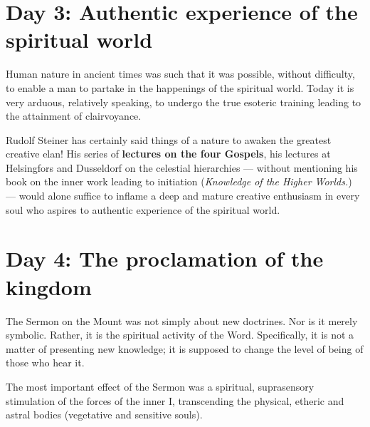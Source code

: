 \section{Day 3: Authentic experience of the spiritual world}

\begin{quotationx}
Human nature in ancient times was such that it was possible, without difficulty, to enable a man to partake in the happenings of the spiritual world. Today it is very arduous, relatively speaking, to undergo the true esoteric training leading to the attainment of clairvoyance.


Rudolf Steiner has certainly said things of a nature to awaken the greatest creative elan! His series of \textbf{lectures on the four Gospels}, his lectures at Helsingfors and Dusseldorf on the celestial hierarchies — without mentioning his book on the inner work leading to initiation (\emph{Knowledge of the Higher Worlds.}) — would alone suffice to inflame a deep and mature creative enthusiasm in every soul who aspires to authentic experience of the spiritual world. 

\end{quotationx}


\section{Day 4: The proclamation of the kingdom}

The Sermon on the Mount was not simply about new doctrines. Nor is it merely symbolic. Rather, it is the spiritual activity of the Word. Specifically, it is not a matter of presenting new knowledge; it is supposed to change the level of being of those who hear it.

The most important effect of the Sermon was a spiritual, suprasensory stimulation of the forces of the inner I, transcending the physical, etheric and astral bodies (vegetative and sensitive souls).

